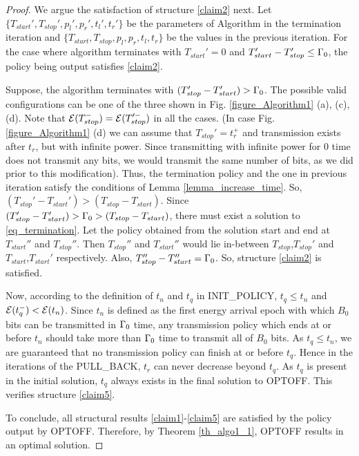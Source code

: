 \begin{proof}
We argue the satisfaction of structure \eqref{claim2} next. Let $\{T_{start}',T_{stop}',p_l',p_r',t_l',t_r'\}$ be the parameters of Algorithm in the termination iteration and $\{T_{start},T_{stop},p_l,p_r,t_l,t_r\}$ be the values in the previous iteration. For the case where algorithm terminates with $T_{start}'=0$ and $T_{start}'-T_{stop}'\le\Gamma_0$, the policy being output satisfies \eqref{claim2}. 

Suppose, the algorithm terminates with $(T_{stop}'-T_{start}')>\Gamma_0$. The possible valid configurations can be one of the three shown in Fig. \ref{figure_Algorithm1} (a), (c), (d). Note that $\mathcal{E}(T_{stop}^-)=\mathcal{E}(T_{stop}'^-)$ in all the cases. (In case Fig. \ref{figure_Algorithm1} (d) we can assume that $T_{stop}'=t_r^+$ and transmission exists after $t_r$, but with infinite power. Since transmitting with infinite power for $0$ time does not transmit any bits, we would transmit the same number of bits, as we did prior to this modification). Thus, the termination policy and the one in previous iteration satisfy the conditions of Lemma \ref{lemma_increase_time}. So, $(T_{stop}'-T_{start}')>(T_{stop}-T_{start})$. Since $(T_{stop}'-T_{start}')>\Gamma_0>(T_{stop}-T_{start})$, there must exist a solution to \eqref{eq_termination}. Let the policy obtained from the solution start and end at $T_{start}''$ and $T_{stop}''$. Then $T_{stop}''$ and $T_{start}''$ would lie in-between $T_{stop}$,$T_{stop}'$ and $T_{start}$,$T_{start}'$ respectively. Also, $T_{stop}''-T_{start}''=\Gamma_0$. So, structure \eqref{claim2} is satisfied.

Now, according to the definition of $t_n$ and $t_q$ in INIT\_POLICY, $t_q\le t_n$ and $\mathcal{E}(t_q^-)<\mathcal{E}(t_n)$. Since $t_n$ is defined as the first energy arrival epoch with which $B_0$ bits can be transmitted in $\Gamma_0$ time, any transmission policy which ends at or before $t_n$ should take more than $\Gamma_0$ time to transmit all of $B_0$ bits. As $t_q\le t_n$, we are guaranteed that no transmission policy can finish at or before $t_q$. Hence in the iterations of the PULL\_BACK, $t_r$ can never decrease beyond $t_q$. As $t_q$ is present in the initial solution, $t_q$ always exists in the final solution to OPTOFF. This verifies structure \eqref{claim5}.  
 
To conclude, all structural results \eqref{claim1}-\eqref{claim5} are satisfied by the policy output by OPTOFF. Therefore,  by Theorem \ref{th_algo1_1}, OPTOFF results in an optimal solution.
\end{proof}